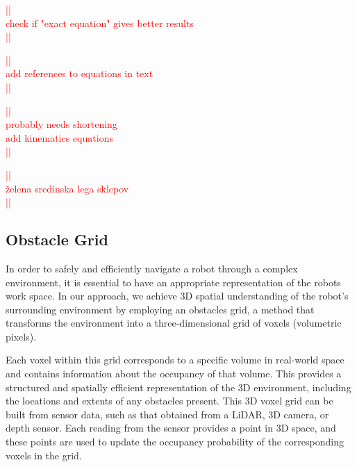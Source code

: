 \documentclass[a4paper]{article}
\newcommand\todocomment[1]{\textcolor{red}{||\\ #1\\||}}
\begin{document}
\todocomment{check if "exact equation" gives better results}





\todocomment{add references to equations in text}

\todocomment{probably needs shortening \\
			 add kinematics equations}
		 
\todocomment{želena sredinska lega sklepov}


\subsection{Obstacle Grid}

In order to safely and efficiently navigate a robot through a complex environment, it is essential to have an appropriate representation of the robots work space. In our approach, we achieve 3D spatial understanding of the robot's surrounding environment by employing an obstacles grid, a method that transforms the environment into a three-dimensional grid of voxels (volumetric pixels).

Each voxel within this grid corresponds to a specific volume in real-world space and contains information about the occupancy of that volume. This provides a structured and spatially efficient representation of the 3D environment, including the locations and extents of any obstacles present. This 3D voxel grid can be built from sensor data, such as that obtained from a LiDAR, 3D camera, or depth sensor. Each reading from the sensor provides a point in 3D space, and these points are used to update the occupancy probability of the corresponding voxels in the grid.



%
%
\end{document}
